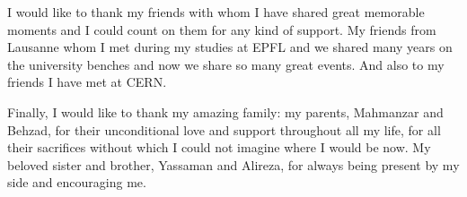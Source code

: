 I would like to thank my friends with whom I have shared great
memorable moments and I could count on them for any kind of
support. My friends from Lausanne whom I met during my studies at EPFL
and we shared many years on the university benches and now we share so
many great events. And also to my friends I have met at CERN.

Finally, I would like to thank my amazing family: my parents,
Mahmanzar and Behzad, for their unconditional love and support
throughout all my life, for all their sacrifices without which I could
not imagine where I would be now. My beloved sister and brother,
Yassaman and Alireza, for always being present by my side and
encouraging me.


